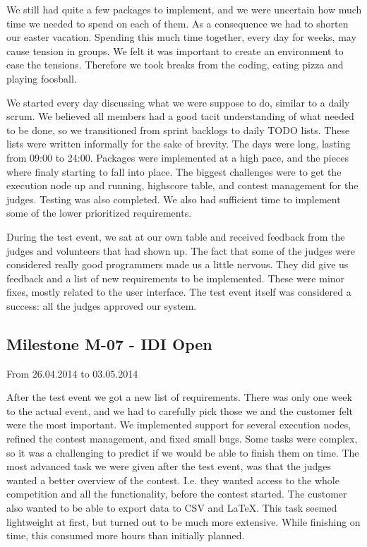 We still had quite a few packages to implement, and we were uncertain
how much time we needed to spend on each of them. As a consequence
we had to shorten our easter vacation. Spending this much time together,
every day for weeks, may cause tension in groups. We felt it was
important to create an environment to ease the tensions. Therefore we
took breaks from the coding, eating pizza and playing foosball. 


We started every day discussing what we were suppose to do, similar to a
daily scrum. We believed all members had a good tacit understanding of
what needed to be done, so we transitioned from sprint backlogs to
daily TODO lists. These lists were written informally for the sake of
brevity.\newline
\newline
The days were long, lasting from 09:00 to 24:00. Packages were
implemented at a high pace, and the pieces where finaly starting to fall into place. 
The biggest challenges were to get the execution node up and
running, highscore table, and contest management for the judges. Testing
was also completed. We also had sufficient time to implement some of
the lower prioritized requirements. 




During the test event, we sat at our own table and received feedback
from the judges and volunteers that had shown up. The fact that some of
the judges were considered really good programmers made us a little
nervous. They did give us feedback and a list of new requirements to be
implemented. These were minor fixes, mostly related to the user
interface. The test event itself was considered a success: all the
judges approved our system.




\subsection{Milestone M-07 - IDI Open}
\label{sec:M07}
From 26.04.2014 to 03.05.2014

After the test event we got a new list of requirements. There was only
one week to the actual event, and we had to carefully pick those we and
the customer felt were the most important. We implemented support for
several execution nodes, refined the contest management, and fixed small
bugs. Some tasks were complex, so it was a challenging to predict if we
would be able to finish them on time. The most advanced task we were
given after the test event, was that the judges wanted a better overview
of the contest. I.e. they wanted access to the whole
competition and all the functionality, before the contest started. The
customer also wanted to be able to export data to CSV and LaTeX. This
task seemed lightweight at first, but turned out to be much more
extensive. While finishing on time, this consumed more hours than
initially planned.




